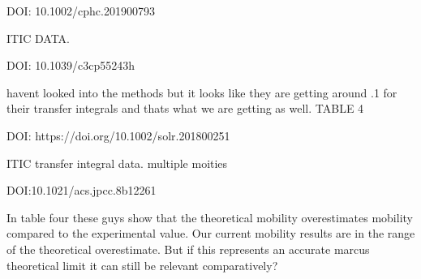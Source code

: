 DOI: 10.1002/cphc.201900793

        ITIC DATA.

DOI: 10.1039/c3cp55243h

    havent looked into the methods but it looks like they are getting around .1 for their transfer
    integrals and thats what we are getting as well.  TABLE 4


DOI: https://doi.org/10.1002/solr.201800251

    ITIC transfer integral data. multiple moities

DOI:10.1021/acs.jpcc.8b12261
 
    In table four these guys show that the theoretical mobility overestimates mobility 
    compared to the experimental value. Our current mobility results are in the range of
    the theoretical overestimate. But if this represents an accurate marcus theoretical
    limit it can still be relevant comparatively?
